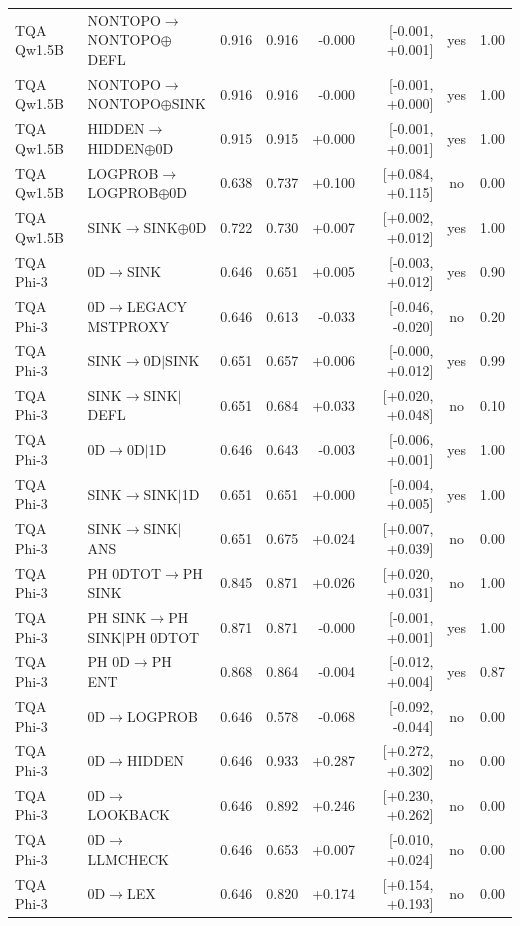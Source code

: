 \begin{longtable}{llrrrrcc}
TQA Qw1.5B & NONTOPO$\to$NONTOPO$\oplus$DEFL & 0.916 & 0.916 & -0.000 & [-0.001, +0.001] & yes & 1.00 \\
TQA Qw1.5B & NONTOPO$\to$NONTOPO$\oplus$SINK & 0.916 & 0.916 & -0.000 & [-0.001, +0.000] & yes & 1.00 \\
TQA Qw1.5B & HIDDEN$\to$HIDDEN$\oplus$0D & 0.915 & 0.915 & +0.000 & [-0.001, +0.001] & yes & 1.00 \\
TQA Qw1.5B & LOGPROB$\to$LOGPROB$\oplus$0D & 0.638 & 0.737 & +0.100 & [+0.084, +0.115] & no & 0.00 \\
TQA Qw1.5B & SINK$\to$SINK$\oplus$0D & 0.722 & 0.730 & +0.007 & [+0.002, +0.012] & yes & 1.00 \\
TQA Phi-3 & 0D$\to$SINK & 0.646 & 0.651 & +0.005 & [-0.003, +0.012] & yes & 0.90 \\
TQA Phi-3 & 0D$\to$LEGACY MSTPROXY & 0.646 & 0.613 & -0.033 & [-0.046, -0.020] & no & 0.20 \\
TQA Phi-3 & SINK$\to$0D$\mid$SINK & 0.651 & 0.657 & +0.006 & [-0.000, +0.012] & yes & 0.99 \\
TQA Phi-3 & SINK$\to$SINK$\mid$DEFL & 0.651 & 0.684 & +0.033 & [+0.020, +0.048] & no & 0.10 \\
TQA Phi-3 & 0D$\to$0D$\mid$1D & 0.646 & 0.643 & -0.003 & [-0.006, +0.001] & yes & 1.00 \\
TQA Phi-3 & SINK$\to$SINK$\mid$1D & 0.651 & 0.651 & +0.000 & [-0.004, +0.005] & yes & 1.00 \\
TQA Phi-3 & SINK$\to$SINK$\mid$ANS & 0.651 & 0.675 & +0.024 & [+0.007, +0.039] & no & 0.00 \\
TQA Phi-3 & PH 0DTOT$\to$PH SINK & 0.845 & 0.871 & +0.026 & [+0.020, +0.031] & no & 1.00 \\
TQA Phi-3 & PH SINK$\to$PH SINK$\mid$PH 0DTOT & 0.871 & 0.871 & -0.000 & [-0.001, +0.001] & yes & 1.00 \\
TQA Phi-3 & PH 0D$\to$PH ENT & 0.868 & 0.864 & -0.004 & [-0.012, +0.004] & yes & 0.87 \\
TQA Phi-3 & 0D$\to$LOGPROB & 0.646 & 0.578 & -0.068 & [-0.092, -0.044] & no & 0.00 \\
TQA Phi-3 & 0D$\to$HIDDEN & 0.646 & 0.933 & +0.287 & [+0.272, +0.302] & no & 0.00 \\
TQA Phi-3 & 0D$\to$LOOKBACK & 0.646 & 0.892 & +0.246 & [+0.230, +0.262] & no & 0.00 \\
TQA Phi-3 & 0D$\to$LLMCHECK & 0.646 & 0.653 & +0.007 & [-0.010, +0.024] & no & 0.00 \\
TQA Phi-3 & 0D$\to$LEX & 0.646 & 0.820 & +0.174 & [+0.154, +0.193] & no & 0.00 \\

\end{longtable}
